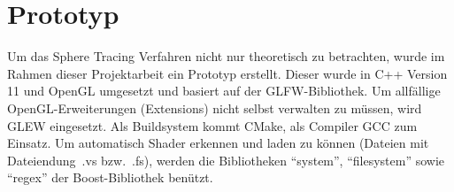 
\chapter{Prototyp}
\label{chap:prototype}

Um das Sphere Tracing Verfahren nicht nur theoretisch zu betrachten,
wurde im Rahmen dieser Projektarbeit ein Prototyp erstellt. Dieser
wurde in C++ Version 11 und OpenGL umgesetzt und basiert auf der
GLFW-Bibliothek. Um allfällige OpenGL-Erweiterungen (Extensions) nicht
selbst verwalten zu müssen, wird GLEW eingesetzt. Als Buildsystem kommt
CMake, als Compiler GCC zum Einsatz. Um automatisch Shader erkennen und
laden zu können (Dateien mit Dateiendung~.vs bzw.~.fs), werden die
Bibliotheken ``system'',  ``filesystem'' sowie ``regex'' der
Boost-Bibliothek benützt.




